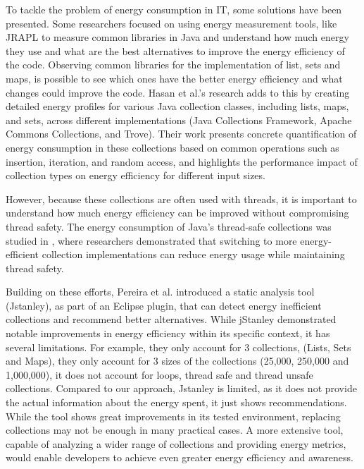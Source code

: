 \documentclass[sigplan]{acmart}
\begin{document}
To tackle the problem of energy consumption in IT, some solutions have been presented. Some researchers focused on using energy measurement tools, like JRAPL to measure common libraries in Java and understand how much energy they use and what are the best alternatives to improve the energy efficiency of the code\cite{10.1145/2896967.2896968}. Observing common libraries for the implementation of list, sets and maps, is possible to see which ones have the better energy efficiency and what changes could improve the code.
Hasan et al.'s \cite{10.1145/2884781.2884869} research adds to this by creating detailed energy profiles for various Java collection classes, including lists, maps, and sets, across different implementations (Java Collections Framework, Apache Commons Collections, and Trove). Their work presents concrete quantification of energy consumption in these collections based on common operations such as insertion, iteration, and random access, and highlights the performance impact of collection types on energy efficiency for different input sizes.

However, because these collections are often used with threads, it is important to understand how much energy efficiency can be improved without compromising thread safety. The energy consumption of Java's thread-safe collections was studied in \cite{7816451}, where researchers demonstrated that switching to more energy-efficient collection implementations can reduce energy usage while maintaining thread safety.

Building on these efforts, Pereira et al.\cite{10.1145/3238147.3240473} introduced a static analysis tool (Jstanley), as part of an Eclipse plugin, that can detect energy inefficient collections and recommend better alternatives. While jStanley demonstrated notable improvements in energy efficiency within its specific context, it has several limitations.
For example, they only account for 3 collections, (Lists, Sets and Maps), they only account for 3 sizes of the collections (25,000, 250,000 and 1,000,000), it does not account for loops, thread safe and thread unsafe collections. Compared to our approach, Jstanley is limited, as it does not provide the actual information about the energy spent, it just shows recommendations. While the tool shows great improvements in its tested environment, replacing collections may not be enough in many practical cases. A more extensive tool, capable of analyzing a wider range of collections and providing energy metrics, would enable developers to achieve even greater energy efficiency and awareness.
\end{document}
